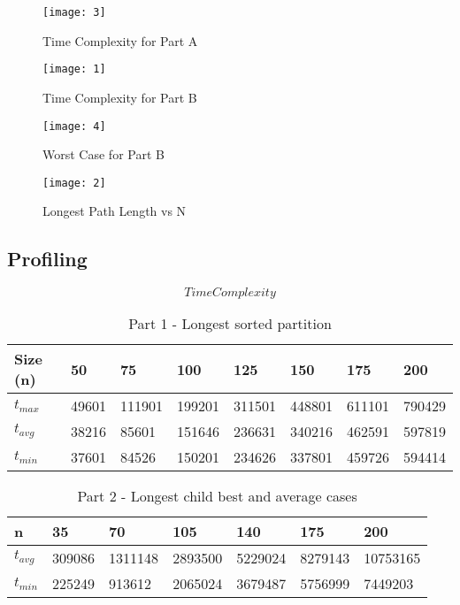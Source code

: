 \documentclass[letterpaper, 11 pt, conference]{ieeeconf}  %
\begin{document}
\begin{figure}
\texttt{[image: 3]}
\caption{Time Complexity for Part A}
\end{figure}

\begin{figure}
\texttt{[image: 1]}
\caption{Time Complexity for Part B}
\end{figure}

\begin{figure}
\texttt{[image: 4]}
\caption{Worst Case for Part B}
\end{figure}

\begin{figure}[H]
\texttt{[image: 2]}
\caption{Longest Path Length vs N}
\end{figure}

\subsection{Profiling}

$$Time Complexity$$

\begin{table}[h!]
\fontsize{8}{11}\selectfont
\begin{center}
\begin{tabu} to 0.5\textwidth {|X[c]|X[c]|X[c]|X[c]|X[c]|X[c]|X[c]|X[c]|} 
 \hline
 Size (n) & 50 & 75 & 100 & 125 & 150 & 175 & 200 \\
 \hline\hline
 $t_{max}$ & 49601 & 111901 & 199201 & 311501 & 448801 & 611101 & 790429 \\
 \hline
 $t_{avg}$ & 38216 & 85601 & 151646 & 236631 & 340216 & 462591 & 597819 \\
 \hline
 $t_{min}$ & 37601 & 84526 & 150201 & 234626 & 337801 & 459726 & 594414 \\
 \hline
\end{tabu}
\label{partition_table}
\caption{Part 1 - Longest sorted partition}
\end{center}
\end{table}

\begin{table}[h!]
\fontsize{7.5}{11}\selectfont
\begin{center}
\begin{tabu} to 0.5\textwidth {|X[c]|X[c]|X[c]|X[c]|X[c]|X[c]|X[c]|} 
 \hline
 n & 35 & 70 & 105 & 140 & 175 & 200 \\
 \hline\hline
 $t_{avg}$ & 309086 & 1311148 & 2893500 & 5229024 & 8279143 & 10753165 \\
 \hline
 $t_{min}$ & 225249 & 913612 & 2065024 & 3679487 & 5756999 & 7449203 \\
 \hline
\end{tabu}
\label{path_table}
\caption{Part 2 - Longest child best and average cases}
\end{center}
\end{table}
\end{document}

